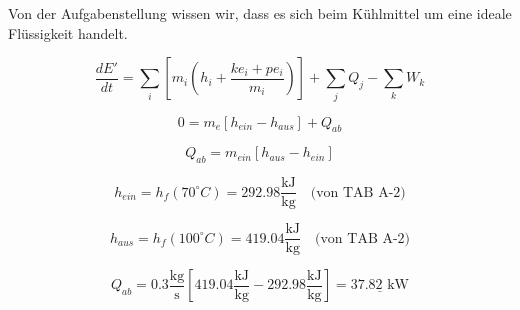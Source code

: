 

\item[a)] Von der Aufgabenstellung wissen wir, dass es sich beim Kühlmittel um eine ideale Flüssigkeit handelt.
    
    \[
    \frac{dE'}{dt} = \sum_i \left[ m_i \left( h_i + \frac{ke_i + pe_i}{m_i} \right) \right] + \sum_j Q_j - \sum_k W_k
    \]
    
    \[
    0 = m_e \left[ h_{ein} - h_{aus} \right] + Q_{ab}
    \]
    
    \[
    Q_{ab} = m_{ein} \left[ h_{aus} - h_{ein} \right]
    \]
    
    \[
    h_{ein} = h_f (70^\circ C) = 292.98 \frac{\text{kJ}}{\text{kg}} \quad \text{(von TAB A-2)}
    \]
    
    \[
    h_{aus} = h_f (100^\circ C) = 419.04 \frac{\text{kJ}}{\text{kg}} \quad \text{(von TAB A-2)}
    \]
    
    \[
    Q_{ab} = 0.3 \frac{\text{kg}}{\text{s}} \left[ 419.04 \frac{\text{kJ}}{\text{kg}} - 292.98 \frac{\text{kJ}}{\text{kg}} \right] = \underline{37.82 \text{ kW}}
    \]